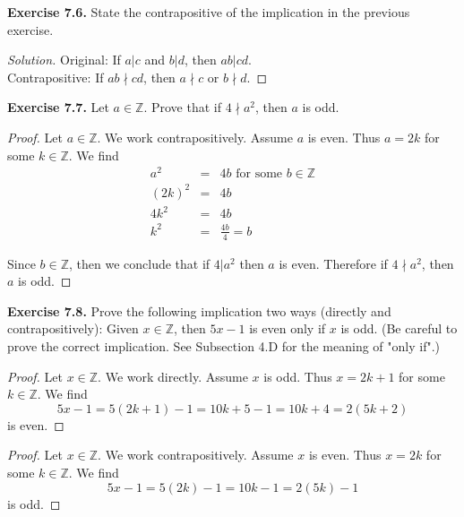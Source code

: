 \documentclass[12pt,oneside]{article}
\newenvironment{exercise}[1]{\vspace{.1in}\noindent\textbf{Exercise #1 \hspace{.05em}}}{}
\newcommand{\Z}{\mathbb{Z}}
\begin{document}

\begin{exercise}{7.6.}
State the contrapositive of the implication in the previous exercise.
\end{exercise}

\begin{proof}[Solution] Original: If $a|c$ and $b|d$, then $ab|cd$. \\
Contrapositive: If $ab \nmid cd$, then $a \nmid c$ or $b \nmid d$. 
\end{proof}



\begin{exercise}{7.7.}
Let $a \in \Z$. Prove that if $4 \nmid a^2$, then $a$ is odd.
\end{exercise}

\begin{proof}
Let $a \in \Z$. We work contrapositively. Assume $a$ is even. Thus $a = 2k$ for some $k \in \Z$. We find
\begin{eqnarray*}
a^2 &=& 4b \text{ for some $b \in \Z$} \\
(2k)^2 &=& 4b \\
4k^2 &=& 4b \\
k^2 &=& \frac{4b}{4} = b
\end{eqnarray*}

Since $b \in \Z$, then we conclude that if $4|a^2$ then $a$ is even. Therefore if $4 \nmid a^2$, then $a$ is odd.
\end{proof}



\begin{exercise}{7.8.}
Prove the following implication two ways (directly and contrapositively): Given $x \in \Z$, then $5x - 1$ is even only if $x$ is odd. (Be careful to prove the correct implication. See Subsection 4.D for the meaning of "only if".)
\end{exercise}

\begin{proof}
Let $x \in \Z$. We work directly. Assume $x$ is odd. Thus $x = 2k + 1$ for some $k \in \Z$. We find
\[5x - 1 = 5(2k + 1) - 1 = 10k + 5 - 1 = 10k + 4 = 2(5k + 2) \]
is even.
\end{proof}

\begin{proof}
Let $x \in \Z$. We work contrapositively. Assume $x$ is even. Thus $x = 2k$ for some $k \in \Z$. We find
\[5x - 1 = 5(2k) - 1 = 10k - 1 = 2(5k) - 1 \]
is odd.
\end{proof}


\end{document}
